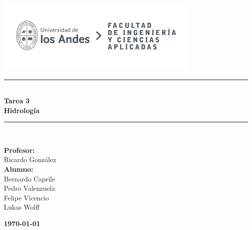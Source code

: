 \documentclass{article}  %
\begin{document}
\begin{titlepage}%
\newcommand{\HRule}{\rule{\linewidth}{0.5mm}} 
\center 
\includegraphics[width=10cm]{LOGO_UNIVERSIDAD.jpg}\\ %
\vspace{3cm}
\HRule \\[0.4cm]
{ \huge \bfseries Tarea 3}\\[0.4cm] %
{ \huge \bfseries Hidrología}\\[0.4cm] %
\HRule \\[1.5cm]
 \vspace{5cm}
\begin{flushright}
    { \textbf{Profesor:}\\
    Ricardo González \\
    \vspace{0.2cm}
    \textbf{Alumno:} \\
    Bernardo Caprile \\
    Pedro Valenzuela \\
    Felipe Vicencio \\
    Lukas Wolff \\
}
\end{flushright}
\vspace{1cm}
{\large \textbf{\today}}\\[2cm] %
\end{titlepage}
\end{document}
